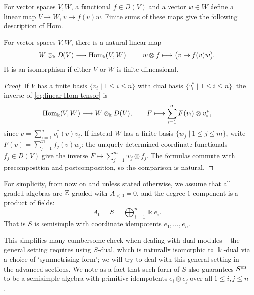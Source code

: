 For vector spaces $V,W$, a functional $f\in D(V)$ and a vector $w\in W$ define a linear map $V\to W$, $v\mapsto f(v)w$.
Finite sums of these maps give the following description of Hom.

\begin{proposition}\label{prop:linear-Hom-tensor}
For vector spaces $V,W$, there is a natural linear map
\begin{equation}\label{eq:linear-Hom-tensor}
W\otimes_\Bbbk D(V)\longrightarrow\operatorname{Hom}\nolimits_\Bbbk(V,W),
\qquad w\otimes f\longmapsto\bigl(v\mapsto f(v)w\bigr).
\end{equation}
It is an isomorphism if either $V$ or $W$ is finite-dimensional.
\end{proposition}

\begin{supplementary}
\begin{proof}
If $V$ has a finite basis $\{v_i\mid 1\leq i\leq n\}$ with dual basis $\{v_i^*\mid 1\leq i\leq n\}$, the inverse of \eqref{eq:linear-Hom-tensor} is
\[
\operatorname{Hom}\nolimits_\Bbbk(V,W)\longrightarrow W\otimes_\Bbbk D(V),
\qquad F\longmapsto\sum_{i=1}^nF(v_i)\otimes v_i^*,
\]
since $v=\sum_{i=1}^n v_i^*(v)v_i$.
If instead $W$ has a finite basis $\{w_j\mid 1\leq j\leq m\}$, write $F(v)=\sum_{j=1}^m f_j(v)w_j$; the uniquely determined coordinate functionals $f_j\in D(V)$ give the inverse $F\mapsto\sum_{j=1}^m w_j\otimes f_j$.
The formulas commute with precomposition and postcomposition, so the comparison is natural.
\end{proof}
\end{supplementary}

\begin{assumption}\label{ass:basic-semisimple}
For simplicity, from now on and unless stated otherwise, we assume that all graded algebras are $\mathbb{Z}$-graded with $A_{<0}=0$, and the degree $0$ component is a product of fields:
\[
A_0=S=\bigoplus_{i=1}^n\Bbbk e_i.
\]
That is $S$ is semisimple with coordinate idempotents $e_1,\ldots,e_n$.
\end{assumption}

This simplifies many cumbersome check when dealing with dual modules -- the general setting requires using $S$-dual, which is naturally isomorphic to $\Bbbk$-dual via a choice of `symmetrising form'; we will try to deal with this general setting in the advanced sections.
We note as a fact that such form of $S$ also guarantees $S^{\mathrm{en}}$ to be a semisimple algebra with primitive idempotents $e_i\otimes e_j$ over all $1\le i,j\le n$.

